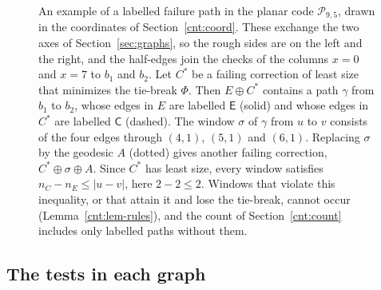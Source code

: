 \documentclass[11pt]{amsart}
\theoremstyle{definition}
\theoremstyle{remark}
\numberwithin{equation}{section}
\begin{document}
\begin{figure}[t]
\centering
{}
\caption{An example of a labelled failure path in the planar code $\mathcal P_{9,5}$, drawn in the coordinates of Section~\ref{cnt:coord}. These exchange the two axes of Section~\ref{sec:graphs}, so the rough sides are on the left and the right, and the half-edges join the checks of the columns $x=0$ and $x=7$ to $b_1$ and $b_2$. Let $C^\ast$ be a failing correction of least size that minimizes the tie-break $\Phi$. Then $E\oplus C^\ast$ contains a path $\gamma$ from $b_1$ to $b_2$, whose edges in $E$ are labelled $\mathsf E$ (solid) and whose edges in $C^\ast$ are labelled $\mathsf C$ (dashed). The window $\sigma$ of $\gamma$ from $u$ to $v$ consists of the four edges through $(4,1)$, $(5,1)$ and $(6,1)$. Replacing $\sigma$ by the geodesic $A$ (dotted) gives another failing correction, $C^\ast\oplus\sigma\oplus A$. Since $C^\ast$ has least size, every window satisfies $n_C-n_E\le|u-v|$, here $2-2\le2$. Windows that violate this inequality, or that attain it and lose the tie-break, cannot occur (Lemma~\ref{cnt:lem-rules}), and the count of Section~\ref{cnt:count} includes only labelled paths without them.}
\label{fig:path}
\end{figure}

\subsection{The tests in each graph}\label{cnt:regions}
\end{document}
